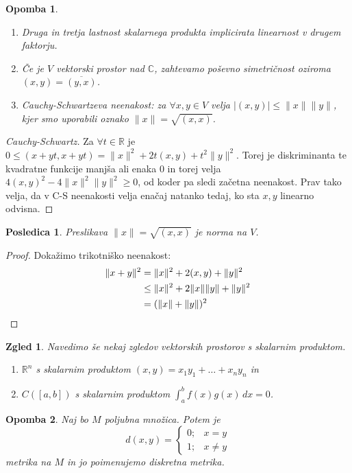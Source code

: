 \documentclass[10pt, a4paper]{article}
\newtheorem{posledica}[izr]{Posledica}
\newtheorem*{opomba}{Opomba}
\newtheorem{zgled}{Zgled}[section]
\newenvironment{noticeC}{%
  \tcolorbox[%
  notitle,
  empty,
  enhanced,  %
  breakable,
  coltext=black, 
  fontupper=\rmfamily,
  parbox=false,
  noparskip,
  sharp corners,
  boxrule=-1pt,  %
  frame hidden,
  left=7pt,  %
  right=7pt,
  top=5pt,
  bottom=5pt,
  before skip=2.5ex plus 2pt,
  after skip=2.5ex plus 2pt,
  overlay unbroken and last={%
  },
  ]}
{\endtcolorbox}
\newenvironment{dokaz}%
  {\begin{noticeC}\begin{proof}}%
  {\end{proof}\end{noticeC}}
\newcommand{\R}{\mathbb {R}}
\newcommand{\C}{\mathbb {C}}
\begin{document}
\begin{opomba}
    \begin{enumerate}
        \item Druga in tretja lastnost skalarnega produkta implicirata linearnost v drugem faktorju.
        \item Če je $V$ vektorski prostor nad $\C$, zahtevamo poševno simetričnost oziroma $(x,y) = \overline{(y,x)}$.
        \item Cauchy-Schwartzeva neenakost: za $\forall x,y \in V$ velja $|(x,y)| \leq \|x\| \|y\|$, kjer smo uporabili oznako $\|x\| = \sqrt{(x,x)}$.
    \end{enumerate}
\end{opomba}

\begin{dokaz}[Cauchy-Schwartz]
    Za $\forall t \in \R$ je $0 \leq (x + yt, x+ yt) = \|x\|^2 + 2t(x,y) + t^2 \|y\|^2$.
    Torej je diskriminanta te kvadratne funkcije manjša ali enaka $0$ in torej velja $4 (x,y)^2 - 4\|x\|^2 \|y\|^2 \geq 0$, od koder pa sledi začetna neenakost.
    Prav tako velja, da v C-S neenakosti velja enačaj natanko tedaj, ko sta $x,y$ linearno odvisna.
\end{dokaz}

\begin{posledica}
    Preslikava $\|x\| = \sqrt{(x,x)}$ je norma na $V$.
\end{posledica}

\begin{dokaz}
    Dokažimo trikotniško neenakost: 
    \begin{align*}
        \|x+y\|^2 &= \|x\|^2 + 2(x,y) + \|y\|^2\\
        &\leq \|x\|^2 + 2\|x\| \|y\| + \|y\|^2\\
        &= (\|x\| + \|y\|)^2 \qedhere
    \end{align*}
\end{dokaz}

\begin{zgled}
    Navedimo še nekaj zgledov vektorskih prostorov s skalarnim produktom.
    \begin{enumerate}
        \item $\R^n$ s skalarnim produktom $(x,y) = x_1 y_1 + \dots + x_n y_n$ in
        \item $C([a, b])$ s skalarnim produktom $\int_a ^b f(x)g(x)\,dx = 0$.
    \end{enumerate}
\end{zgled}

\begin{opomba}
    Naj bo $M$ poljubna množica. Potem je $$d(x,y) = \begin{cases}
        0; & x = y\\
        1; & x \neq y
    \end{cases}$$ metrika na $M$ in jo poimenujemo diskretna metrika.
\end{opomba}
\end{document}
